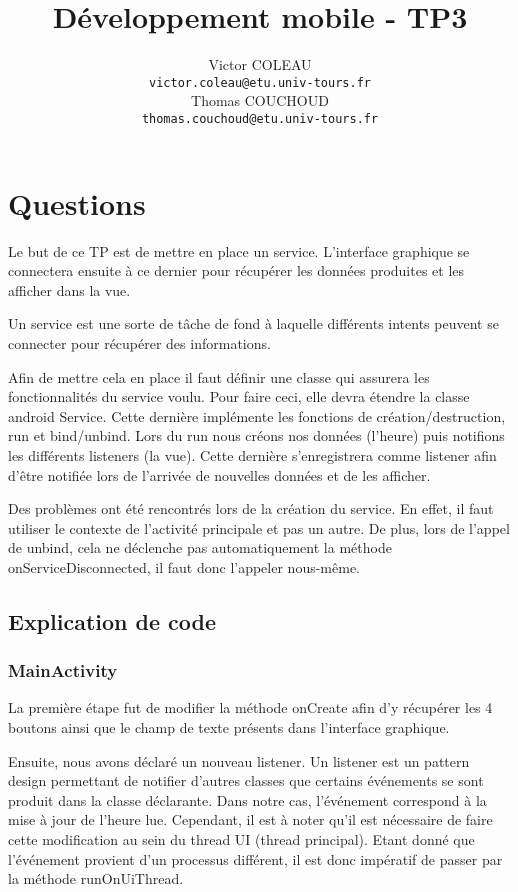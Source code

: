 \documentclass{report}
\title{Développement mobile - TP3}
\author{Victor COLEAU\\\texttt{victor.coleau@etu.univ-tours.fr}\\Thomas COUCHOUD\\\texttt{thomas.couchoud@etu.univ-tours.fr}}
\begin{document}
	\mccTitle
	
	\chapter{Questions}
		Le but de ce TP est de mettre en place un service. 
		L'interface graphique se connectera ensuite à ce dernier pour récupérer les données produites et les afficher dans la vue.
		
		Un service est une sorte de tâche de fond à laquelle différents intents peuvent se connecter pour récupérer des informations.
		
		Afin de mettre cela en place il faut définir une classe qui assurera les fonctionnalités du service voulu. Pour faire ceci, elle devra étendre la classe android Service.
		Cette dernière implémente les fonctions de création/destruction, run et bind/unbind.
		Lors du run nous créons nos données (l'heure) puis notifions les différents listeners (la vue).
		Cette dernière s'enregistrera comme listener afin d'être notifiée lors de l'arrivée de nouvelles données et de les afficher.
		
		Des problèmes ont été rencontrés lors de la création du service.
		En effet, il faut utiliser le contexte de l'activité principale et pas un autre.
		De plus, lors de l'appel de unbind, cela ne déclenche pas automatiquement la méthode onServiceDisconnected, il faut donc l'appeler nous-même.

	\section{Explication de code}
		\subsection{MainActivity}
			La première étape fut de modifier la méthode onCreate afin d'y récupérer les 4 boutons ainsi que le champ de texte présents dans l'interface graphique.
	
			Ensuite, nous avons déclaré un nouveau listener.
			Un listener est un pattern design permettant de notifier d'autres classes que certains événements se sont produit dans la classe déclarante.
			Dans notre cas, l'événement correspond à la mise à jour de l'heure lue.
			Cependant, il est à noter qu'il est nécessaire de faire cette modification au sein du thread UI (thread principal).
			Etant donné que l'événement provient d'un processus différent, il est donc impératif de passer par la méthode runOnUiThread.
	
\end{document}
